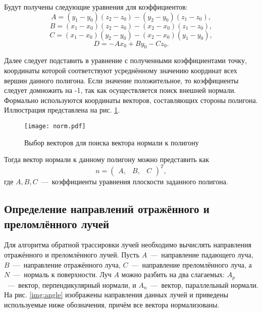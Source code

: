Будут получены следующие уравнения для коэффициентов:
\begin{equation}
	A = (y_1 - y_0)(z_2 - z_0) - (y_2 - y_0)(z_1 - z_0),
\end{equation}
\begin{equation}
	B = (x_1 - x_0)(z_2 - z_0) - (x_2 - x_0)(z_1 - z_0),
\end{equation}
\begin{equation}
	C = (x_1 - x_0)(y_2 - y_0) - (x_2 - x_0)(y_1 - y_0),
\end{equation}
\begin{equation}
	D = -Ax_0 + By_0 - Cz_0.
\end{equation}

Далее следует подставить в уравнение с полученными коэффициентами точку, координаты которой соответствуют усреднённому значению координат всех вершин данного полигона. Если значение положительное, то коэффициенты следует домножить на -1, так как осуществляется поиск внешней нормали.
Формально используются координаты векторов, составляющих стороны полигона. Иллюстрация представлена на рис. \ref{img:norm}.\\

\begin{figure}[h!]
    \centering
    \texttt{[image: norm.pdf]}
    \caption{Выбор векторов для поиска вектора нормали к полигону}
    \label{img:norm}
\end{figure}

Тогда вектор нормали к данному полигону можно представить как
\begin{equation}
	n = \begin{pmatrix} A, & B, & C
 \end{pmatrix}^{T},
\end{equation}
где $A, B, C$~---~коэффициенты уравнения плоскости заданного полигона.

\subsection{Определение направлений отражённого и преломлённого лучей}
Для алгоритма обратной трассировки лучей необходимо вычислять направления отражённого и преломлённого лучей. Пусть $A$~---~направление падающего луча, $B$~---~направление отражённого луча, $C$~---~направление преломлённого луча, а $N$~---~нормаль к поверхности. Луч $A$ можно разбить на два слагаемых: $A_p$~---~вектор, перпендикулярный нормали, и  $A_n$~---~вектор, параллельный нормали. На рис. \ref{img:angle} изображены направления данных лучей и приведены используемые ниже обозначения, причём все вектора нормализованы.

